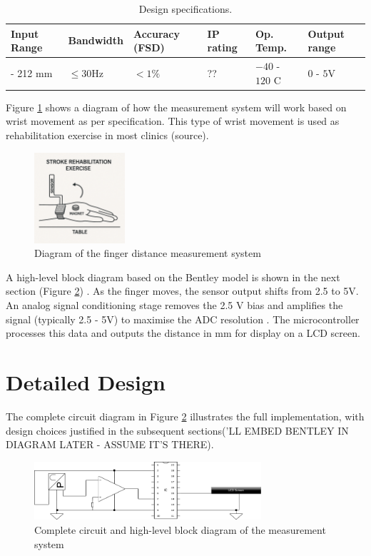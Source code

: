 \documentclass[a4paper,12pt]{article}
\begin{document}
\begin{table}[ht]
\centering
\caption{Design specifications.}
\begin{tabular}{|>{\centering\arraybackslash}p{2.2cm}|>{\centering\arraybackslash}p{2.5cm}|>{\centering\arraybackslash}p{2cm}|>{\centering\arraybackslash}p{1.5cm}|>{\centering\arraybackslash}p{2.5cm}|>{\centering\arraybackslash}p{2.5cm}|}
\hline
\textbf{Input Range} & \textbf{Bandwidth} & \textbf{Accuracy (FSD)} & \textbf{IP rating} & \textbf{Op. Temp.} & \textbf{Output range} \\
\hline
0 - 212 mm & $\leq 30 \text{Hz}$ & $<1\%$ & ?? & $-40$ - $120$ \textdegree{}C & $0$ - $5 \text{V}$  \\
\hline
\end{tabular}
\end{table}
\noindent
Figure \ref{fig:measure_diag} shows a diagram of how the measurement system will work based on wrist movement as per specification. This type of wrist movement is used as rehabilitation exercise in most clinics (source).
\begin{figure}[!ht]
    \centering
    \includegraphics[width=0.3\textwidth]{diagram-Measure.png}
    \caption{Diagram of the finger distance measurement system}
    \label{fig:measure_diag}
\end{figure}
A high-level block diagram based on the Bentley model is shown in the next section (Figure \ref{fig:cct_system}) . As the finger moves, the sensor output shifts from 2.5 to 5V. An analog signal conditioning stage removes the 2.5 V bias and amplifies the signal (typically 2.5 - 5V) to maximise the ADC resolution . The microcontroller processes this data and outputs the distance in mm for display on a LCD screen.


%
\section{Detailed Design}
 The complete circuit diagram in Figure \ref{fig:cct_system} illustrates the full implementation, with design choices justified in the subsequent sections('LL EMBED BENTLEY IN DIAGRAM LATER - ASSUME IT'S THERE). 
\begin{figure}[!ht]
    \centering
    \includegraphics[width=0.75\textwidth]{LabCctDiag.png}
    \caption{Complete circuit and high-level block diagram of the measurement system}
    \label{fig:cct_system}
\end{figure}
\end{document}
